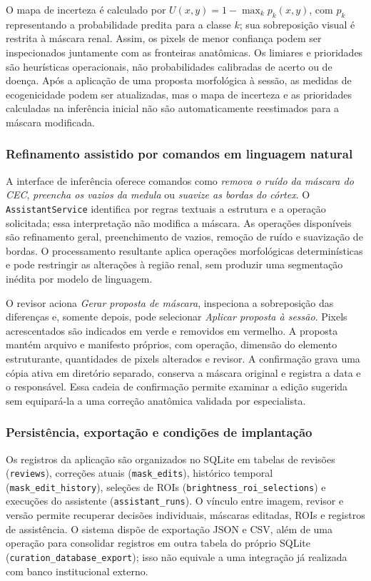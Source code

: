 \documentclass[12pt]{article}
\begin{document}
O mapa de incerteza é calculado por $U(x,y)=1-\max_k p_k(x,y)$, com $p_k$ representando a probabilidade predita para a classe $k$; sua sobreposição visual é restrita à máscara renal. Assim, os pixels de menor confiança podem ser inspecionados juntamente com as fronteiras anatômicas. Os limiares e prioridades são heurísticas operacionais, não probabilidades calibradas de acerto ou de doença. Após a aplicação de uma proposta morfológica à sessão, as medidas de ecogenicidade podem ser atualizadas, mas o mapa de incerteza e as prioridades calculadas na inferência inicial não são automaticamente reestimados para a máscara modificada.

\subsubsection{Refinamento assistido por comandos em linguagem natural}
\label{sec:curadoria_comandos}

A interface de inferência oferece comandos como \emph{remova o ruído da máscara do CEC}, \emph{preencha os vazios da medula} ou \emph{suavize as bordas do córtex}. O \texttt{AssistantService} identifica por regras textuais a estrutura e a operação solicitada; essa interpretação não modifica a máscara. As operações disponíveis são refinamento geral, preenchimento de vazios, remoção de ruído e suavização de bordas. O processamento resultante aplica operações morfológicas determinísticas e pode restringir as alterações à região renal, sem produzir uma segmentação inédita por modelo de linguagem.

O revisor aciona \emph{Gerar proposta de máscara}, inspeciona a sobreposição das diferenças e, somente depois, pode selecionar \emph{Aplicar proposta à sessão}. Pixels acrescentados são indicados em verde e removidos em vermelho. A proposta mantém arquivo e manifesto próprios, com operação, dimensão do elemento estruturante, quantidades de pixels alterados e revisor. A confirmação grava uma cópia ativa em diretório separado, conserva a máscara original e registra a data e o responsável. Essa cadeia de confirmação permite examinar a edição sugerida sem equipará-la a uma correção anatômica validada por especialista.

\subsubsection{Persistência, exportação e condições de implantação}
\label{sec:curadoria_persistencia}

Os registros da aplicação são organizados no SQLite em tabelas de revisões (\texttt{reviews}), correções atuais (\texttt{mask\_edits}), histórico temporal (\texttt{mask\_edit\_history}), seleções de ROIs (\texttt{brightness\_roi\_selections}) e execuções do assistente (\texttt{assistant\_runs}). O vínculo entre imagem, revisor e versão permite recuperar decisões individuais, máscaras editadas, ROIs e registros de assistência. O sistema dispõe de exportação JSON e CSV, além de uma operação para consolidar registros em outra tabela do próprio SQLite (\texttt{curation\_database\_export}); isso não equivale a uma integração já realizada com banco institucional externo.
\end{document}
